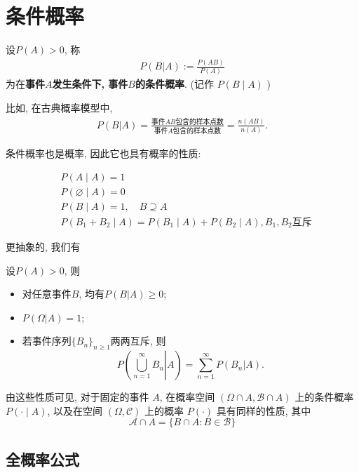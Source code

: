 \section{条件概率}

\begin{definition}
    设$P(A)>0$, 称
    \begin{align*}
        P(B|A):=\frac{P(AB)}{P(A)}
    \end{align*}
    为在\textbf{事件$A$发生条件下, 事件$B$的条件概率}. (记作 $P(B \mid A)$ )
\end{definition}

比如, 在古典概率模型中, 
\begin{align*}
    P(B|A)=\frac{\mbox{事件$AB$包含的样本点数}}{\mbox{事件$A$包含的样本点数}}=\frac{n(AB)}{n(A)}.
\end{align*}

条件概率也是概率, 因此它也具有概率的性质:

$$
\begin{aligned}
& P(A \mid A)=1 \\
& P(\varnothing \mid A)=0 \\
& P(B \mid A)=1, \quad B \supseteq A \\
& P\left(B_1+B_2 \mid A\right)=P\left(B_1 \mid A\right)+P\left(B_2 \mid A\right), B_1,B_2\text{互斥}
\end{aligned}
$$

更抽象的, 我们有

\begin{proposition}
    设$P(A)>0$, 则
    \begin{itemize}
        \item 对任意事件$B$, 均有$P(B|A)\ge 0$; 
        \item $P(\Omega|A)=1$; 
        \item 若事件序列$\{B_n\}_{n\ge 1}$两两互斥, 则
              $$P\left( \left. \bigcup_{n=1}^{\infty} B_n \right| A\right)=\sum_{n=1}^{\infty} P(B_n|A).$$
    \end{itemize}
\end{proposition}

由这些性质可见, 对于固定的事件 $A$, 在概率空间 $(\Omega \cap A, \mathscr{B} \cap A)$ 上的条件概率 $P(\cdot \mid A)$, 以及在空间 $(\Omega, \mathscr{C})$ 上的概率 $P(\cdot)$ 具有同样的性质, 其中
$$
\mathscr{A} \cap A=\{B \cap A: B \in \mathscr{B}\}
$$

\subsection*{全概率公式}

